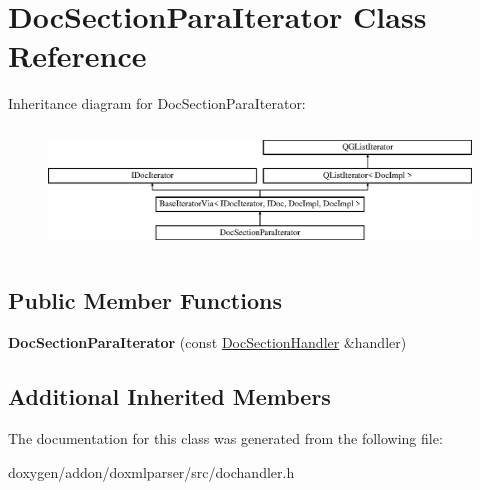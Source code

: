 \hypertarget{class_doc_section_para_iterator}{}\section{Doc\+Section\+Para\+Iterator Class Reference}
\label{class_doc_section_para_iterator}
Inheritance diagram for Doc\+Section\+Para\+Iterator\+:\begin{figure}[H]
\begin{center}
\leavevmode
\includegraphics[height=3.294118cm]{class_doc_section_para_iterator}
\end{center}
\end{figure}
\subsection*{Public Member Functions}
\begin{DoxyCompactItemize}
\item 
\mbox{\label{class_doc_section_para_iterator_a6d72ff97e6f93da2605c2bc874112105}} 
{\bfseries Doc\+Section\+Para\+Iterator} (const \mbox{\hyperlink{class_doc_section_handler}{Doc\+Section\+Handler}} \&handler)
\end{DoxyCompactItemize}
\subsection*{Additional Inherited Members}


The documentation for this class was generated from the following file\+:\begin{DoxyCompactItemize}
\item 
doxygen/addon/doxmlparser/src/dochandler.\+h\end{DoxyCompactItemize}
